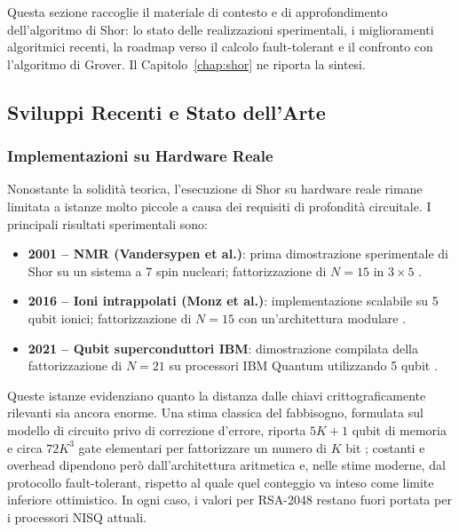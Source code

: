 
Questa sezione raccoglie il materiale di contesto e di approfondimento dell'algoritmo di Shor: lo stato delle realizzazioni sperimentali, i miglioramenti algoritmici recenti, la roadmap verso il calcolo fault-tolerant e il confronto con l'algoritmo di Grover. Il Capitolo~\ref{chap:shor} ne riporta la sintesi.

\subsection{Sviluppi Recenti e Stato dell'Arte}

\subsubsection{Implementazioni su Hardware Reale}

Nonostante la solidità teorica, l'esecuzione di Shor su hardware reale rimane limitata a istanze molto piccole a causa dei requisiti di profondità circuitale. I principali risultati sperimentali sono:

\begin{itemize}
    \item \textbf{2001 -- \ac{NMR} (Vandersypen et al.)}: prima dimostrazione sperimentale di Shor su un sistema a 7 spin nucleari; fattorizzazione di $N = 15$ in $3 \times 5$ \cite{vandersypen2001}.
    \item \textbf{2016 -- Ioni intrappolati (Monz et al.)}: implementazione scalabile su 5 qubit ionici; fattorizzazione di $N = 15$ con un'architettura modulare \cite{monz2016}.
    \item \textbf{2021 -- Qubit superconduttori \ac{IBM}}: dimostrazione compilata della fattorizzazione di $N = 21$ su processori \ac{IBM} Quantum utilizzando 5 qubit \cite{skosana2021}.
\end{itemize}

Queste istanze evidenziano quanto la distanza dalle chiavi crittograficamente rilevanti sia ancora enorme. Una stima classica del fabbisogno, formulata sul modello di circuito privo di correzione d'errore, riporta $5K+1$ qubit di memoria e circa $72K^3$ gate elementari per fattorizzare un numero di $K$ bit \cite{beckman1996}; costanti e overhead dipendono però dall'architettura aritmetica e, nelle stime moderne, dal protocollo fault-tolerant, rispetto al quale quel conteggio va inteso come limite inferiore ottimistico. In ogni caso, i valori per RSA-2048 restano fuori portata per i processori \ac{NISQ} attuali.

